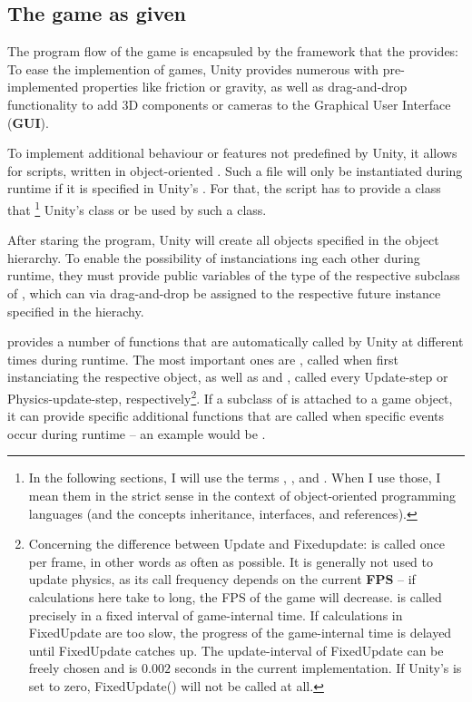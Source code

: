 \subsection{The game as given}
\label{ch:gamedescription}

The program flow of the game is encapsuled by the framework that the  provides: To ease the implemention of games, Unity provides numerous  with pre-implemented properties like friction or gravity, as well as drag-and-drop functionality to add 3D components or cameras to the Graphical User Interface (\textbf{GUI}).

To implement additional behaviour or features not predefined by Unity, it allows for scripts, written in object-oriented . Such a file will only be instantiated during runtime if it is specified in Unity's . For that, the script has to provide a class that \footnote{In the following sections, I will use the terms , ,  and . When I use those, I mean them in the strict sense in the context of object-oriented programming languages (and the concepts inheritance, interfaces, and references).} Unity's class  or be used by such a class.

After staring the program, Unity will create all objects specified in the object hierarchy. To enable the possibility of instanciations ing each other during runtime, they must provide public variables of the type of the respective subclass of , which can via drag-and-drop be assigned to the respective future instance specified in the hierachy. 

 provides a number of functions that are automatically called by Unity at different times during runtime. The most important ones are , called when first instanciating the respective object, as well as  and , called every Update-step or Physics-update-step, respectively\footnote{Concerning the difference between Update and Fixedupdate:  is called once per frame, in other words as often as possible. It is generally not used to update physics, as its call frequency depends on the current \textbf{FPS} -- if calculations here take to long, the FPS of the game will decrease.  is called precisely in a fixed interval of game-internal time. If calculations in FixedUpdate are too slow, the progress of the game-internal time is delayed until FixedUpdate catches up. The update-interval of FixedUpdate can be freely chosen and is $0.002$ seconds in the current implementation. If Unity's  is set to zero, FixedUpdate() will not be called at all.}. If a subclass of  is attached to a game object, it can provide specific additional functions that are called when specific events occur during runtime -- an example would be .\\

